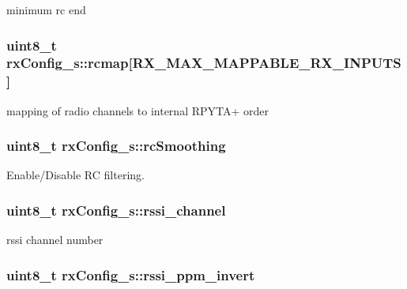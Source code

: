 minimum rc end 

\hypertarget{structrxConfig__s_a4a6452d61a6fee066a8bb12032c3a8d1}{
\subsubsection[{rcmap}]{\setlength{\rightskip}{0pt plus 5cm}uint8\+\_\+t rx\+Config\+\_\+s\+::rcmap\mbox{[}{\bf R\+X\+\_\+\+M\+A\+X\+\_\+\+M\+A\+P\+P\+A\+B\+L\+E\+\_\+\+R\+X\+\_\+\+I\+N\+P\+U\+T\+S}\mbox{]}}}\label{structrxConfig__s_a4a6452d61a6fee066a8bb12032c3a8d1}


mapping of radio channels to internal R\+P\+Y\+T\+A+ order 

\hypertarget{structrxConfig__s_aada23b2a7dd616b0a4e8556e1e500d2e}{
\subsubsection[{rc\+Smoothing}]{\setlength{\rightskip}{0pt plus 5cm}uint8\+\_\+t rx\+Config\+\_\+s\+::rc\+Smoothing}}\label{structrxConfig__s_aada23b2a7dd616b0a4e8556e1e500d2e}


Enable/\+Disable R\+C filtering. 

\hypertarget{structrxConfig__s_a50bbac4beb27d371543e0ecab9bb7e24}{
\subsubsection[{rssi\+\_\+channel}]{\setlength{\rightskip}{0pt plus 5cm}uint8\+\_\+t rx\+Config\+\_\+s\+::rssi\+\_\+channel}}\label{structrxConfig__s_a50bbac4beb27d371543e0ecab9bb7e24}


rssi channel number 

\hypertarget{structrxConfig__s_a09023842ed3aba63a004843434fa80b3}{
\subsubsection[{rssi\+\_\+ppm\+\_\+invert}]{\setlength{\rightskip}{0pt plus 5cm}uint8\+\_\+t rx\+Config\+\_\+s\+::rssi\+\_\+ppm\+\_\+invert}}\label{structrxConfig__s_a09023842ed3aba63a004843434fa80b3}



